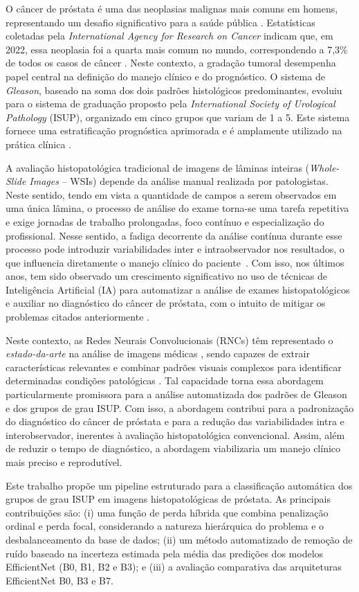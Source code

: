 O câncer de próstata é uma das neoplasias malignas mais comuns em homens, representando um desafio significativo para a saúde pública \cite{ref_siegel2024}. Estatísticas coletadas pela \textit{International Agency for Research on Cancer} indicam que, em 2022, essa neoplasia foi a quarta mais comum no mundo, correspondendo a 7,3\% de todos os casos de câncer \cite{JournalStatistic2024}. Neste contexto, a gradação tumoral desempenha papel central na definição do manejo clínico e do prognóstico. O sistema de \textit{Gleason}, baseado na soma dos dois padrões histológicos predominantes, evoluiu para o sistema de graduação proposto pela \textit{International Society of Urological Pathology} (ISUP), organizado em cinco grupos que variam de 1 a 5. Este sistema fornece uma estratificação prognóstica aprimorada e é amplamente utilizado na prática clínica \cite{ref-epstein2016}.


A avaliação histopatológica tradicional de imagens de lâminas inteiras (\textit{Whole-Slide Images} – WSIs) depende da análise manual realizada por patologistas. Neste sentido, tendo em vista a quantidade de campos a serem observados em uma única lâmina, o processo de análise do exame torna-se uma tarefa repetitiva e exige jornadas de trabalho prolongadas, foco contínuo e especialização do profissional. Nesse sentido, a fadiga decorrente da análise contínua durante esse processo pode introduzir variabilidades inter e intraobservador nos resultados, o que influencia diretamente o manejo clínico do paciente~\cite{ref-bulten2020}. Com isso, nos últimos anos, tem sido observado um crescimento significativo no uso de técnicas de Inteligência Artificial (IA) para automatizar a análise de exames histopatológicos e auxiliar no diagnóstico do câncer de próstata, com o intuito de mitigar os problemas citados anteriormente \cite{expert2022review}.

Neste contexto, as Redes Neurais Convolucionais (RNCs) têm representado o \textit{estado-da-arte} na análise de imagens médicas \cite{ref-campanella2019}, sendo capazes de extrair características relevantes e combinar padrões visuais complexos para identificar determinadas condições patológicas \cite{araujo2021active}. Tal capacidade torna essa abordagem particularmente promissora para a análise automatizada dos padrões de Gleason e dos grupos de grau ISUP. Com isso, a abordagem contribui para a padronização do diagnóstico do câncer de próstata e para a redução das variabilidades intra e interobservador, inerentes à avaliação histopatológica convencional. Assim, além de reduzir o tempo de diagnóstico, a abordagem viabilizaria um manejo clínico mais preciso e reprodutível.

Este trabalho propõe um pipeline estruturado para a classificação automática dos grupos de grau ISUP em imagens histopatológicas de próstata. As principais contribuições são: (i) uma função de perda híbrida que combina penalização ordinal e perda focal, considerando a natureza hierárquica do problema e o desbalanceamento da base de dados; (ii) um método automatizado de remoção de ruído baseado na incerteza estimada pela média das predições dos modelos EfficientNet (B0, B1, B2 e B3); e (iii) a avaliação comparativa das arquiteturas EfficientNet B0, B3 e B7.